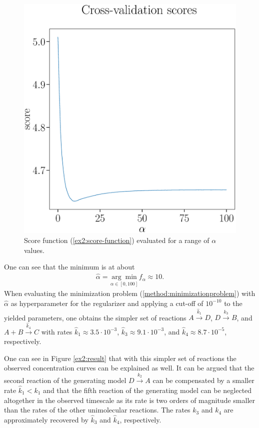 \documentclass[oneside, abstracton, titlepage]{scrartcl}
\begin{document}
	\begin{figure}
		\begin{center}
			\includegraphics[width=.5\textwidth]{./figures_tex/cv_score}
		\end{center}
		\caption{Score function (\ref{ex2:score-function}) evaluated for a range of $\alpha$ values.}
		\label{ex2:score-graph}
	\end{figure}

	One can see that the minimum is at about
	\begin{align}
		\hat{\alpha} = \underset{\alpha\in[0,100]}{\arg\min}f_\alpha\approx 10.
	\end{align}
	When evaluating the minimization problem (\ref{method:minimizationproblem}) with $\hat{\alpha}$ as hyperparameter for the regularizer and applying a cut-off of $10^{-10}$ to the yielded parameters, one obtains the simpler set of reactions $A\xrightarrow{\hat{k}_1}D$, $D\xrightarrow{\hat{k}_3} B$, and $A+B\xrightarrow{\hat{k}_4}C$ with rates $\hat{k}_1 \approx 3.5\cdot 10^{-3}$, $\hat{k}_3\approx 9.1\cdot 10^{-3}$, and $\hat{k}_4\approx 8.7\cdot 10^{-5}$, respectively.
	
	One can see in Figure \ref{ex2:result} that with this simpler set of reactions the observed concentration curves can be explained as well. It can be argued that the second reaction of the generating model $D\xrightarrow{k_2}A$ can be compensated by a smaller rate $\hat{k}_1 < k_1$ and that the fifth reaction of the generating model can be neglected altogether in the observed timescale as its rate is two orders of magnitude smaller than the rates of the other unimolecular reactions. 
	The rates $k_3$ and $k_4$ are approximately recovered by $\hat{k}_3$ and $\hat{k}_4$, respectively.
	
\end{document}
